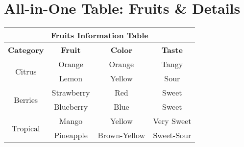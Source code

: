 \documentclass{article}
\begin{document}
\section*{All-in-One Table: Fruits & Details}

\begin{center}
\begin{tabular}{|c|c|c|c|}
\hline
\multicolumn{4}{|c|}{\textbf{Fruits Information Table}} \\
\hline
\textbf{Category} & \textbf{Fruit} & \textbf{Color} & \textbf{Taste} \\
\hline
\multirow{2}{*}{Citrus} & Orange & Orange & Tangy \\
                        & Lemon  & Yellow & Sour \\
\hline
\multirow{2}{*}{Berries} & Strawberry & Red & Sweet \\
                         & Blueberry  & Blue & Sweet \\
\hline
\multirow{2}{*}{Tropical} & Mango & Yellow & Very Sweet \\
                          & Pineapple & Brown-Yellow & Sweet-Sour \\
\hline
\end{tabular}
\end{center}
\end{document}
